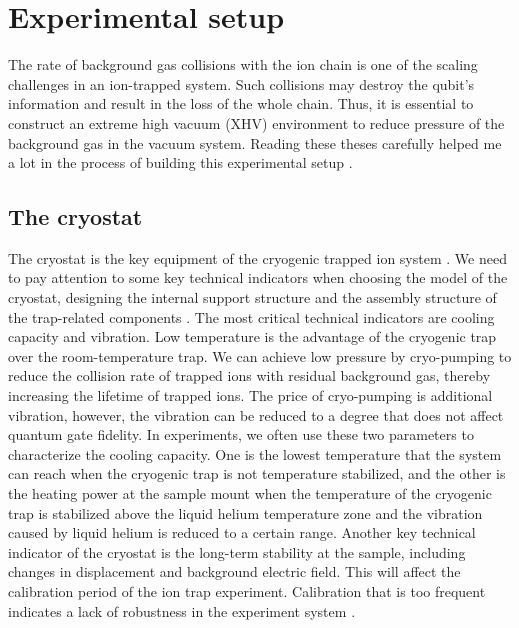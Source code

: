 
\chapter{Experimental setup}

The rate of background gas collisions with the ion chain is one of the scaling challenges in an ion-trapped system. Such collisions may destroy the qubit's information and result in the loss of the whole chain. Thus, it is essential to construct an extreme high vacuum (XHV) environment to reduce pressure of the background gas in the vacuum system. Reading these theses carefully helped me a lot in the process of building this experimental setup \cite{RN84,RN133,RN358,RN307}.



\section{The cryostat}

The cryostat is the key equipment of the cryogenic trapped ion system \cite{RN58,RN38,RN59,RN260}. We need to pay attention to some key technical indicators when choosing the model of the cryostat, designing the internal support structure and the assembly structure of the trap-related components \cite{RN93}. The most critical technical indicators are cooling capacity and vibration. Low temperature is the advantage of the cryogenic trap over the room-temperature trap. We can achieve low pressure by cryo-pumping to reduce the collision \cite{RN134} rate of trapped ions with residual background gas, thereby increasing the lifetime of trapped ions. The price of cryo-pumping is additional vibration, however, the vibration can be reduced to a degree that does not affect quantum gate fidelity. In experiments, we often use these two parameters to characterize the cooling capacity. One is the lowest temperature that the system can reach when the cryogenic trap is not temperature stabilized, and the other is the heating power at the sample mount when the temperature of the cryogenic trap is stabilized above the liquid helium temperature zone and the vibration caused by liquid helium is reduced to a certain range. Another key technical indicator of the cryostat is the long-term stability at the sample, including changes in displacement and background electric field. This will affect the calibration period of the ion trap experiment. Calibration that is too frequent indicates a lack of robustness in the experiment system \cite{RN84}.

